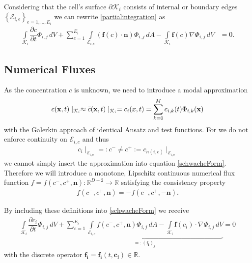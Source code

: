 		Considering that the cell's surface $\partial \mathcal{K}_i$ consists of internal or boundary edges $\left\{\mathcal{E}_{i,e}\right\}_{e = 1,...,E_i}$ we can rewrite \eqref{partialintegration} as
		\begin{align}
				\int\limits_{\mathcal{K}_i} \dfrac{\partial c}{\partial t}\Phi_{i,j} \, dV +
				\sum_{e=1}^{E_i}\int\limits_{\mathcal{E}_{i,e}} \left(\boldsymbol{f} \left( c \right) \cdot \boldsymbol{n} \right)\Phi_{i,j} \, dA
				- \int\limits_{\mathcal{K}_i} \boldsymbol{f}\left(c\right)\nabla\Phi_{i,j} \, dV &= 0.
				\label{schwacheForm}
		\end{align}
		\subsection{Numerical Fluxes}
		
		As the concentration $c$ is unknown, we need to introduce a modal approximation
		\begin{align}
			c(\mathbf{x} , t)\mid _{\mathcal{K}_i} \approx \bar{c} (\mathbf{x} , t)\mid _{\mathcal{K}_i} = c_i (\boldmath{x} , t) = \sum_{k = 0}^{M}c_{i,k}(t) \Phi_{i,k}(\mathbf{x})
		\end{align}
		with the Galerkin approach of identical Ansatz and test functions. 
		For we do not enforce continuity on $\mathcal{E}_{i,e}$ and thus 
		\begin{align}
			c_i \mid_{\mathcal{E}_{i,e}}=: c^- \neq c^+ := c_{n(i,e)} \mid_{\mathcal{E}_{i,e}}
		\end{align}
		we cannot simply insert the approximation into equation \eqref{schwacheForm}.
		Therefore we will introduce a monotone, Lipschitz continuous numerical flux function  $f = f(c^-, c^+, \mathbf{n}):\mathbb{R}^{D+2}\rightarrow\mathbb{R}$ satisfying the consistency property
		\begin{align}
			f(c^-, c^+, \mathbf{n}) = - f(c^-, c^+, -\mathbf{n}).
		\end{align}
		
		By including these definitions into \eqref{schwacheForm} we receive
		\begin{align}
			\int\limits_{\mathcal{K}_i} \dfrac{\partial c_i}{\partial t}\Phi_{i,j} \, dV +
			\underbrace{\sum_{e=1}^{E_i}\int\limits_{\mathcal{E}_{i,e}} f \left( c^-, c^+, \mathbf{n} \right) \Phi_{i,j} \, dA - \int\limits_{\mathcal{K}_i} \boldsymbol{f}\left(c_i\right) \cdot \nabla\Phi_{i,j} \, dV}_{=:(\mathbf{f_i})_j} = 0
			\label{schwacheFormFlux}
		\end{align}
		with the discrete operator $\mathbf{f_i}=\mathbf{f_i}(t, \mathbf{c_i})\in\mathbb{R}$.
		
